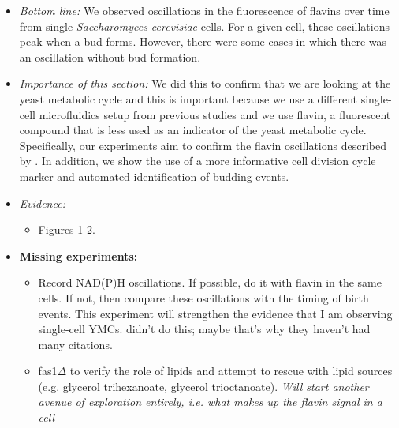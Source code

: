 \begin{itemize}
\item \emph{Bottom line:} We observed oscillations in the fluorescence of flavins over time from single \textit{Saccharomyces cerevisiae} cells.  For a given cell, these oscillations peak when a bud forms.  However, there were some cases in which there was an oscillation without bud formation.
\item \emph{Importance of this section:} We did this to confirm that we are looking at the yeast metabolic cycle and this is important because we use a different single-cell microfluidics setup from previous studies and we use flavin, a fluorescent compound that is less used as an indicator of the yeast metabolic cycle.  Specifically, our experiments aim to confirm the flavin oscillations described by \cite{baumgartnerFlavinbasedMetabolicCycles2018}.  In addition, we show the use of a more informative cell division cycle marker and automated identification of budding events.
\item \emph{Evidence:}
\begin{itemize}
\item Figures 1-2.
\end{itemize}

\item \textbf{Missing experiments:}
\begin{itemize}
\item Record NAD(P)H oscillations.  If possible, do it with flavin in the same cells.  If not, then compare these oscillations with the timing of birth events.  This experiment will strengthen the evidence that I am observing single-cell YMCs.  \cite{baumgartnerFlavinbasedMetabolicCycles2018} didn't do this; maybe that's why they haven't had many citations.
\item fas1\(\Delta\) to verify the role of lipids and attempt to rescue with lipid sources (e.g. glycerol trihexanoate, glycerol trioctanoate). \emph{Will start another avenue of exploration entirely, i.e. what makes up the flavin signal in a cell}
\end{itemize}
\end{itemize}

